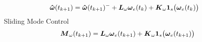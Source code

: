 \begin{nomenclature}
\begin{subequations}
\begin{align}
    \boldsymbol{\hat{\omega}}(t_{k+1}) &= \boldsymbol{\hat{\omega}}(t_{k+1})^- + \boldsymbol{L}_{\omega} \boldsymbol{\omega}_e(t_{k}) + \boldsymbol{K}_{\omega}\boldsymbol{1}_s \big(\boldsymbol{\omega}_e(t_{k}) \big)
  \end{align}
  \label{eqn:SMOEstimatorwithPredictionUnforcedMotion}
\end{subequations}
Sliding Mode Control
\begin{equation}
  \boldsymbol{M}_{\omega}(t_{k+1}) = \boldsymbol{L}_{\omega} \boldsymbol{\omega}_e(t_{k+1}) + \boldsymbol{K}_{\omega}\boldsymbol{1}_s \big(\boldsymbol{\omega}_e(t_{k+1}) \big)
  \label{eqn:SMController}
\end{equation}


\end{nomenclature}


